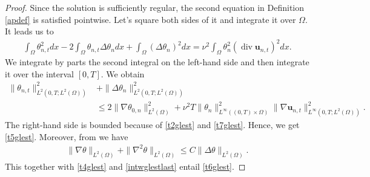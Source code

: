 \documentclass[11pt]{article}
\numberwithin{equation}{section}
\theoremstyle{plain}
\newcommand\bb[1]{\mathbf{#1}}
\newcommand{\tn}{\Omega}
\newcommand{\io}{\int_{\Omega}}
\newcommand{\ld}{L^2(\Omega)}
\renewcommand{\div}{\operatorname{div}}
\begin{document}
\begin{proof}
Since the solution is sufficiently regular, the second equation in Definition \ref{apdef} is satisfied pointwise. Let's square both sides of it and integrate it over $\tn$. It leads us to
\begin{align*}
\io \theta_{n,t}^2dx-2\io \theta_{n,t}\Delta\theta_ndx+\io(\Delta\theta_n)^2dx=\nu^2\io \theta_n^2(\div\bb u_{n,t})^2dx.
\end{align*}
We integrate by parts the second integral on the left-hand side and then integrate it over the interval $[0, T]$. We obtain
\begin{align}\label{intwglestlast}
\|\theta_{n,t}\|_{L^2(0,T;\ld)}^2&+\|\Delta\theta_n\|_{L^2(0,T;\ld)}^2\nonumber\\
&\leq 2\|\nabla\theta_{0,n}\|_{\ld}^2+\nu^2T\|\theta_n\|_{L^{\infty}((0,T)\times\tn)}^2\|\nabla\bb u_{n,t}\|^2_{L^{\infty}(0,T;\ld)}.
\end{align}
The right-hand side is bounded because of \eqref{t2glest} and \eqref{t7glest}. Hence, we get \eqref{t5glest}. Moreover, from \cite[Theorem III.4.3]{Boyer} we have
\begin{align*}
\|\nabla\theta\|_{\ld}+\|\nabla^2\theta\|_{\ld}\leq C\|\Delta\theta\|_{\ld}.
\end{align*}
This together with \eqref{t4glest} and \eqref{intwglestlast} entail \eqref{t6glest}.
\end{proof}
\end{document}
